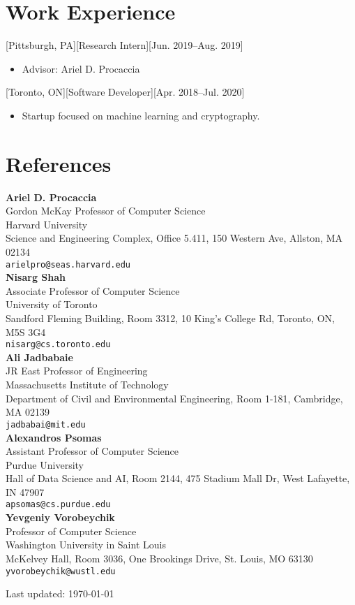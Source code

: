 \documentclass{article}
\begin{document}
\section{Work Experience}
    [Pittsburgh, PA][Research Intern][Jun. 2019--Aug. 2019]
    \begin{itemize}[noitemsep,nolistsep]
        \item Advisor: Ariel D. Procaccia
    \end{itemize}
    [Toronto, ON][Software Developer][Apr. 2018--Jul. 2020]
    \begin{itemize}[noitemsep,nolistsep]
        \item Startup focused on machine learning and cryptography. 
    \end{itemize}

\section{References}

\noindent
\textbf{Ariel D. Procaccia} \\
Gordon McKay Professor of Computer Science \\
Harvard University \\
Science and Engineering Complex, Office 5.411, 150 Western Ave, Allston, MA 02134 \\
\texttt{arielpro@seas.harvard.edu} \\[0.8em]
\textbf{Nisarg Shah} \\
Associate Professor of Computer Science\\
University of Toronto \\
Sandford Fleming Building, Room 3312, 10 King's College Rd, Toronto, ON, M5S 3G4 \\
\texttt{nisarg@cs.toronto.edu} \\[0.8em]
\textbf{Ali Jadbabaie} \\
JR East Professor of Engineering \\
Massachusetts Institute of Technology \\
Department of Civil and Environmental Engineering, Room 1-181, Cambridge, MA 02139 \\
\texttt{jadbabai@mit.edu} \\[0.8em]
\textbf{Alexandros Psomas} \\
Assistant Professor of Computer Science \\
Purdue University \\
Hall of Data Science and AI, Room 2144, 475 Stadium Mall Dr, West Lafayette, IN 47907 \\
\texttt{apsomas@cs.purdue.edu} \\[0.8em]
\textbf{Yevgeniy Vorobeychik} \\
Professor of Computer Science\\
Washington University in Saint Louis \\
McKelvey Hall, Room 3036, One Brookings Drive, St. Louis, MO 63130 \\
\texttt{yvorobeychik@wustl.edu}


    \vfill
\begin{center}
    Last updated: \today
\end{center}
    
\end{document}
